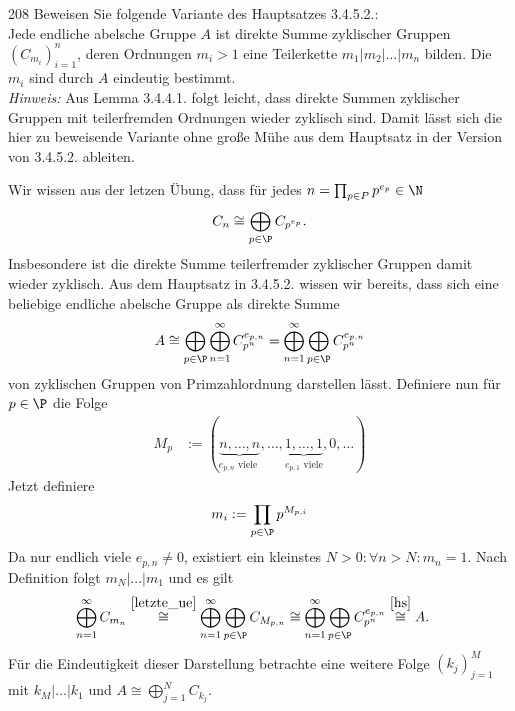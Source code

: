 \begin{algebraUE}{208}
Beweisen Sie folgende Variante des Hauptsatzes 3.4.5.2.: \\
Jede endliche abelsche Gruppe $A$ ist direkte Summe zyklischer Gruppen $(C_{m_i})_{i=1}^n$,
deren Ordnungen $m_i > 1$ eine Teilerkette $m_1 | m_2 | \dots | m_n$ bilden.
Die $m_i$ sind durch $A$ eindeutig bestimmt. \\
\textit{Hinweis:} Aus Lemma 3.4.4.1. folgt leicht, dass direkte Summen zyklischer
Gruppen mit teilerfremden Ordnungen wieder zyklisch sind. Damit lässt sich die
hier zu beweisende Variante ohne große Mühe aus dem Hauptsatz in der Version
von 3.4.5.2. ableiten.
\end{algebraUE}
\begin{solution}
Wir wissen aus der letzen Übung, dass für jedes $n = \prod_{p \in P}p^{e_p}\in \N$
\begin{align}\label{letzte_ue}
  C_n \cong \bigoplus_{p \in \P}C_{p^{e_p}}.
\end{align}
Insbesondere ist die direkte Summe teilerfremder zyklischer Gruppen damit wieder zyklisch.
Aus dem Hauptsatz in 3.4.5.2. wissen wir bereits, dass sich eine beliebige endliche
abelsche Gruppe als direkte Summe
\begin{align}\label{hs}
  A \cong \bigoplus_{p \in \P}\bigoplus_{n=1}^{\infty}C_{p^n}^{e_{p,n}}
  =  \bigoplus_{n=1}^{\infty}\bigoplus_{p \in \P}C_{p^n}^{e_{p,n}}
\end{align}
von zyklischen Gruppen von Primzahlordnung darstellen lässt.
Definiere nun für $p \in \P$ die Folge
\begin{align*}
  M_p &:= (\underbrace{n,\dots,n}_{e_{p,n} \text{ viele }},\dots,
  \underbrace{1,\dots,1}_{e_{p,1} \text{ viele}},0,\dots)
\end{align*}
Jetzt definiere
\begin{align*}
  m_i := \prod_{p \in \P}p^{M_{p,i}}
\end{align*}
Da nur endlich viele $e_{p,n} \neq 0$, existiert ein kleinstes $N > 0: \forall n > N: m_n = 1$.
Nach Definition folgt $m_N | \dots | m_1$ und es gilt
\begin{align*}
  \bigoplus_{n = 1}^{\infty} C_{m_n} &\stackrel{\eqref{letzte_ue}}{\cong} \bigoplus_{n = 1}^{\infty}\bigoplus_{p \in \P}C_{M_{p,n}}
  \cong \bigoplus_{n=1}^{\infty}\bigoplus_{p \in \P}C_{p^n}^{e_{p,n}}
  \stackrel{\eqref{hs}}{\cong} A.
\end{align*}
Für die Eindeutigkeit dieser Darstellung betrachte eine weitere Folge $(k_j)_{j=1}^M$
mit $k_M | \dots | k_1$ und $A \cong \bigoplus_{j = 1}^{N} C_{k_j}$.

\end{solution}
